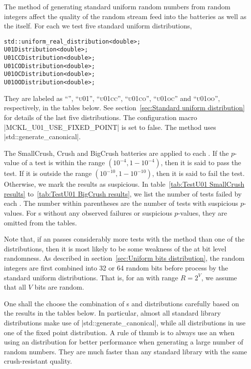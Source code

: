 The method of generating standard uniform random numbers from random integers
affect the quality of the random stream feed into the \testu batteries as well
as the \rng itself. For each \rng we test five standard uniform distributions,
\begin{verbatim}
std::uniform_real_distribution<double>;
U01Distribution<double>;
U01CCDistribution<double>;
U01CODistribution<double>;
U01OCDistribution<double>;
U01OODistribution<double>;
\end{verbatim}
They are labeled as ``\std'', ``\textsc{u01}'', ``\textsc{u01cc}'',
``\textsc{u01co}'', ``\textsc{u01oc}'' and ``\textsc{u01oo}'', respectively, in
the tables below. See section~\ref{sec:Standard uniform distribution} for
details of the last five distributions. The configuration macro
|MCKL_U01_USE_FIXED_POINT| is set to false. The \std method uses
|std::generate_canonical|.

The SmallCrush, Crush and BigCrush batteries are applied to each \rng. If the
$p$-value of a test is within the range $(10^{-4}, 1 - 10^{-4})$, then it is
said to pass the test. If it is outside the range $(10^{-10}, 1 - 10^{-10})$,
then it is said to fail the test. Otherwise, we mark the results as suspicious.
In table~\ref{tab:TestU01 SmallCrush results} to~\ref{tab:TestU01 BigCrush
results}, we list the number of tests failed by each \rng. The number within
parentheses are the number of tests with suspicious $p$-values. For \rng{}s
without any observed failures or suspicious $p$-values, they are omitted from
the tables.

Note that, if an \rng passes considerably more tests with the \std method than
one of the \mckl distributions, then it is most likely to be some weakness of
the \rng at bit level randomness. As described in section~\ref{sec:Uniform bits
distribution}, the random integers are first combined into 32 or 64 random bits
before process by the standard uniform distributions. That is, for an \rng with
range $R = 2^V$, we assume that all $V$ bits are random.

One shall the choose the combination of \rng{}s and distributions carefully
based on the results in the tables below. In particular, almost all standard
library distributions make use of |std::generate_canonical|, while all
distributions in \mckl use one of the fixed point distribution. A rule of thumb
is to always use an \mckl \rng when using an \mckl distribution for better
performance when generating a large number of random numbers. They are much
faster than any standard library \rng with the same crush-resistant quality.

